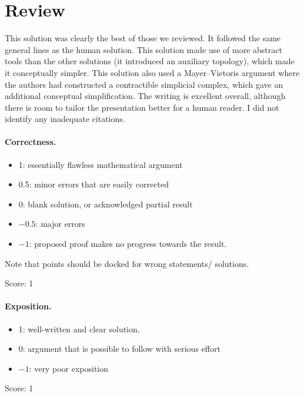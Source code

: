 \documentclass[11pt]{article}
\theoremstyle{definition}
\theoremstyle{remark}
\begin{document}
\maketitle

\section{Review}

This solution was clearly the best of those we reviewed.  It followed the same general lines as the human solution.  This solution made use of more abstract tools than the other solutions (it introduced an auxiliary topology), which made it conceptually simpler.  This solution also used a Mayer--Vietoris argument where the authors had constructed a contractible simplicial complex, which gave an additional conceptual simplification.  The writing is excellent overall, although there is room to tailor the presentation better for a human reader.  I did not identify any inadequate citations.

\paragraph{Correctness.}
\begin{itemize}
	\item  1: essentially flawless mathematical argument
	\item  0.5: minor errors that are easily corrected
	\item  0: blank solution, or acknowledged partial result
	\item  $-0.5$: major errors
	\item  $-1$: proposed proof makes no progress towards the result.
\end{itemize}
Note that points should be docked for wrong statements/ solutions.

\noindent Score: 1

\paragraph{Exposition.}
\begin{itemize}
	\item  1: well-written and clear solution.
	\item  0: argument that is possible to follow with serious effort
	\item  $-1$: very poor exposition
\end{itemize}

\noindent Score: 1
\end{document}
